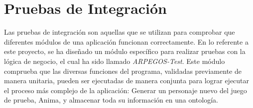 
\section{Pruebas de Integración}
Las pruebas de integración son aquellas que se utilizan para comprobar que diferentes módulos de una 
aplicación funcionan correctamente. En lo referente a este proyecto, se ha diseñado un 
módulo específico para realizar pruebas con la lógica de negocio, el cual ha sido llamado 
\textit{ARPEGOS-Test}. Este módulo comprueba que las diversas funciones del programa, 
validadas previamente de manera unitaria, pueden ser ejecutadas de manera conjunta para 
lograr ejecutar el proceso más complejo de la aplicación: Generar un personaje nuevo del 
juego de prueba, Anima, y almacenar toda su información en una ontología.